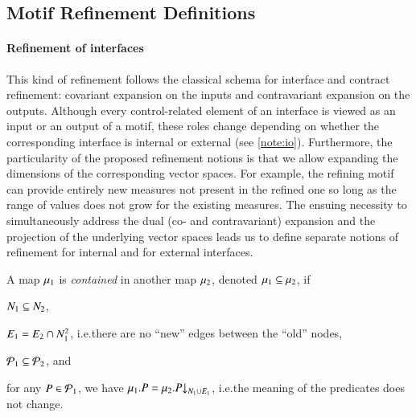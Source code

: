 \documentclass[runningheads]{llncs}
\makeatletter
\newenvironment{textlist}{\begin{enumerate*}[label=(\emph{\roman*})]}{\end{enumerate*}}
\newcommand{\ie}[1][\@ ]{i.e.{#1}}
\newcommand{\map}[1][]{\mu\ifx#1\relax\else^{#1}\fi}
\newcommand{\predicates}[1][]{\mathcal{P}\ifx#1\relax\else^{#1}\fi}
\newcommand{\edges}[1][]{E\ifx#1\relax\else^{#1}\fi}
\newcommand{\nodes}[1][]{N\ifx#1\relax\else^{#1}\fi}
\newcommand{\project}[3][]{{#2}{\downarrow}\ifx#1\relax\else_{#3}\fi}
\makeatother
\begin{document}
\subsection{Motif Refinement Definitions}
\label{secn:refinement:defs}

\paragraph{Refinement of interfaces}
This kind of refinement follows the classical schema for interface and contract refinement: covariant expansion on the inputs and contravariant expansion on the outputs.  Although every control-related element of an interface is viewed as an input or an output of a motif, these roles change depending on whether the corresponding interface is internal or external (see \cref{note:io}).  Furthermore, the particularity of the proposed refinement notions is that we allow expanding the dimensions of the corresponding vector spaces.  For example, the refining motif can provide entirely new measures not present in the refined one so long as the range of values does not grow for the existing measures.  The ensuing necessity to simultaneously address the dual (co- and contravariant) expansion and the projection of the underlying vector spaces leads us to define separate notions of refinement for internal and for external interfaces.

\begin{definition}
  \label{defn:map:contain}
  A map $\map_{1}$ is \emph{contained} in another map $\map_{2}$, denoted $\map_{1} \subseteq \map_{2}$, if
  \begin{textlist}
  \item $\nodes_{1} \subseteq \nodes_{2}$,
  \item $\edges_{1} = \edges_{2} \cap \nodes_{1}^2$, \ie there are no ``new'' edges between the ``old'' nodes,
  \item $\predicates_{1} \subseteq \predicates_{2}$, and
  \item for any $P \in \predicates_{1}$, we have $\map_{1}.P = \project[x]{\map_{2}.P}{\nodes_{1} \cup \edges_{1}}$, \ie the meaning of the predicates does not change.
  \end{textlist}
\end{definition}
\end{document}
